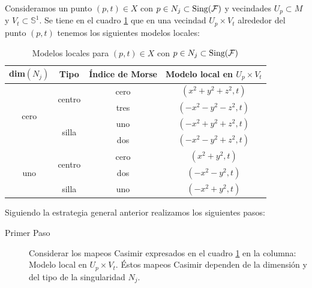 \documentclass[a4paper,10pt]{book}
\begin{document}
Consideramos un punto $(p,t)\in X$ con $p\in N_{j}\subset{\rm Sing(\mathcal{F})}$ y vecindades $U_{p}\subset M$ y $V_{t}\subset\mathbb{S}^{1}$. Se tiene en el cuadro \ref{tabla2} que en una vecindad $U_{p}\times V_{t}$ alrededor del punto $(p,t)$ tenemos los siguientes modelos locales: 
\begin{table}[!ht]
\centering
\begin{tabular}{|c|c|c|c|}
\hline
{\rm dim$(N_{j})$}  & Tipo                    & \multicolumn{1}{l|}{\'Indice de Morse} & Modelo local en $U_{p}\times V_{t}$ \\ \hline
\multirow{4}{*}{cero} & \multirow{2}{*}{centro} & cero                                   & $(x^{2}+y^{2}+z^{2},t)$                          \\ \cline{3-4} 
                      &                         & tres                                   & $(-x^{2}-y^{2}-z^{2},t)$                         \\ \cline{2-4} 
                      & \multirow{2}{*}{silla}  & uno                                    & $(-x^{2}+y^{2}+z^{2},t)$                         \\ \cline{3-4} 
                      &                         & dos                                    & $(-x^{2}-y^{2}+z^{2},t)$                         \\ \hline
\multirow{3}{*}{uno}  & \multirow{2}{*}{centro} & cero                                   & $(x^{2}+y^{2},t)$                                \\ \cline{3-4} 
                      &                         & dos                                    & $(-x^{2}-y^{2},t)$                               \\ \cline{2-4} 
                      & silla                   & uno                                    & $(-x^{2}+y^{2},t)$                               \\ \hline
\end{tabular}
\caption{Modelos locales para $(p,t)\in X$ con $p\in N_{j}\subset{\rm Sing(\mathcal{F})}$}
\label{tabla2}
\end{table}

Siguiendo la estrategia general anterior realizamos los siguientes pasos:

\begin{description}
    \item[Primer Paso] Considerar los mapeos Casimir expresados en el cuadro \ref{tabla2} en la columna: Modelo local en $U_{p}\times V_{t}$. \'Estos mapeos Casimir dependen de la dimensi\'on y del tipo de la singularidad $N_{j}$.
\end{description} 
\end{document}
